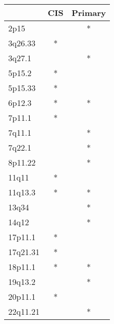 \begin{tabular}{lcc}
\toprule
{} & CIS & Primary \\
\midrule
2p15     &     &       * \\
3q26.33  &   * &         \\
3q27.1   &     &       * \\
5p15.2   &   * &         \\
5p15.33  &   * &         \\
6p12.3   &   * &       * \\
7p11.1   &   * &         \\
7q11.1   &     &       * \\
7q22.1   &     &       * \\
8p11.22  &     &       * \\
11q11    &   * &         \\
11q13.3  &   * &       * \\
13q34    &     &       * \\
14q12    &     &       * \\
17p11.1  &   * &         \\
17q21.31 &   * &         \\
18p11.1  &   * &       * \\
19q13.2  &     &       * \\
20p11.1  &   * &         \\
22q11.21 &     &       * \\
\bottomrule
\end{tabular}
